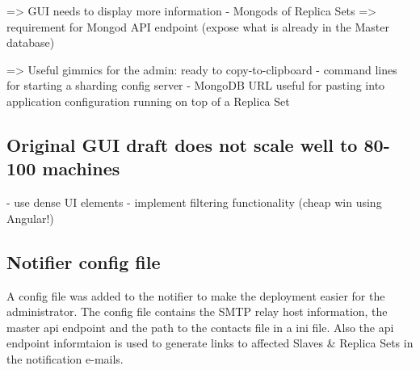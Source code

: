 => GUI needs to display more information
    - Mongods of Replica Sets
    => requirement for Mongod API endpoint (expose what is already in the Master database)

=> Useful gimmics for the admin: ready to copy-to-clipboard 
    - command lines for starting a sharding config server
    - MongoDB URL useful for pasting into application configuration running on top of a Replica Set

\subsection{Original GUI draft does not scale well to 80-100 machines }

- use dense UI elements
- implement filtering functionality (cheap win using Angular!)

\subsection{Notifier config file}

A config file was added to the notifier to make the deployment easier for the administrator. The config file contains the SMTP relay host 
information, the master api endpoint and the path to the contacts file in a ini file. Also the api endpoint informtaion is used to generate 
links to affected Slaves \& Replica Sets in the notification e-mails.
